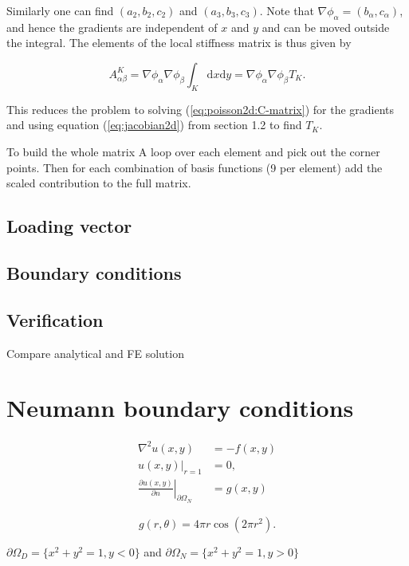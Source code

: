 \documentclass[paper=a4, fontsize=11pt]{scrartcl} %
\begin{document}
Similarly one can find $(a_2, b_2,c_2)$ and $(a_3, b_3,c_3)$. Note that $\nabla \phi_\alpha=(b_\alpha,c_\alpha)$, and hence the gradients are independent of $x$ and $y$ and can be moved outside the integral. The elements of the local stiffness matrix is thus given by

\[ A^K_{\alpha\beta} =\nabla \phi_\alpha \nabla \phi_\beta \int_{K} \mathrm{d}x\mathrm{d}y = \nabla \phi_\alpha \nabla \phi_\beta T_K.\]

This reduces the problem to solving (\ref{eq:poisson2d:C-matrix}) for the gradients and using equation (\ref{eq:jacobian2d}) from section 1.2 to find $T_K$.

To build the whole matrix A loop over each element and pick out the corner points. Then for each combination of basis functions (9 per element) add the scaled contribution to the full matrix.

\subsection{Loading vector}

\subsection{Boundary conditions}
\subsection{Verification}
Compare analytical and FE solution

\section{Neumann boundary conditions}
\begin{equation}
\begin{aligned}
\nabla^2u(x,y) 	&= -f(x,y) \\
u(x,y)|_{r=1} 	&= 0, \\
\left. \frac{\partial u(x,y)}{\partial n}\right|_{\partial\Omega_N} &= g(x,y)
\end{aligned}
\label{eq:poisson2d:Neu:problem}
\end{equation}

\begin{equation}
g(r,\theta) =4\pi r\cos(2\pi r^2).
\label{eq:poisson2d:Neu:condition}
\end{equation}

$\partial\Omega_D = \{x^2+y^2=1,y<0\}$ and $\partial\Omega_N = \{x^2+y^2=1,y>0\}$
\end{document}
